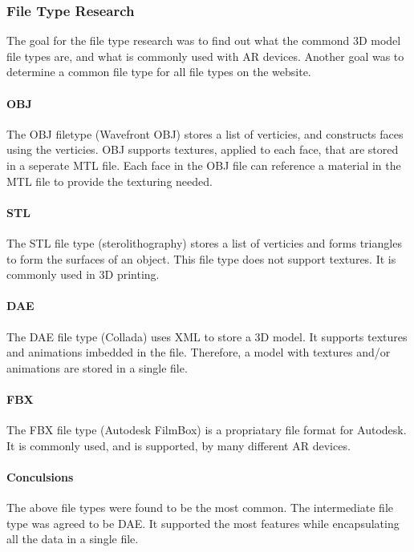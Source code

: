     \subsubsection{File Type Research}

    The goal for the file type research was to find out what the commond 3D model file types are, and what is commonly used with AR devices.  Another goal was to determine a common file type for all file types on the website.

    \paragraph{OBJ}
    The OBJ filetype (Wavefront OBJ) stores a list of verticies, and constructs faces using the verticies.  OBJ supports textures, applied to each face, that are stored in a seperate MTL file.  Each face in the OBJ file can reference a material in the MTL file to provide the texturing needed.

    \paragraph{STL}
    The STL file type (sterolithography) stores a list of verticies and forms triangles to form the surfaces of an object.  This file type does not support textures.  It is commonly used in 3D printing.

    \paragraph{DAE}
    The DAE file type (Collada) uses XML to store a 3D model.  It supports textures and animations imbedded in the file.  Therefore, a model with textures and/or animations are stored in a single file.

    \paragraph{FBX}
    The FBX file type (Autodesk FilmBox) is a propriatary file format for Autodesk.  It is commonly used, and is supported, by many different AR devices.

    \paragraph{Conculsions}
    The above file types were found to be the most common.  The intermediate file type was agreed to be DAE.  It supported the most features while encapsulating all the data in a single file.

